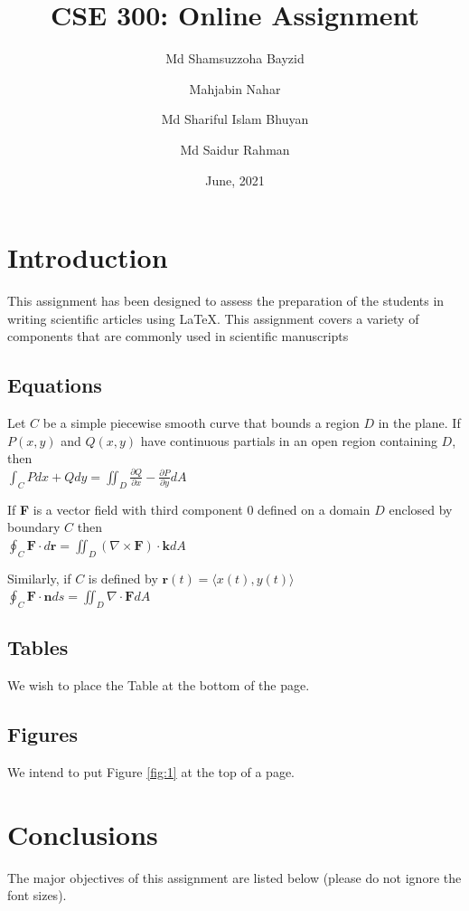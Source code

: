 \documentclass[12pt, a4paper]{article}
\title{CSE 300: Online Assignment}
\author{Md Shamsuzzoha Bayzid}
\author{Mahjabin Nahar}
\author{Md Shariful Islam Bhuyan}
\author{Md Saidur Rahman}
\affil[]{}
\date{June, 2021}
\begin{document}
	
\maketitle

\section{Introduction}
	This assignment has been designed to assess the preparation of the students
	in writing scientific articles using \LaTeX. This assignment covers a variety of
	components that are commonly used in scientific manuscripts
	
\subsection{Equations}
	Let $C$ be a simple piecewise smooth curve that bounds a region $D$ in the
	plane. If $P(x, y)$ and $Q(x, y)$ have continuous partials in an open region
	containing $D$, then \\
	$\int_C P dx + Q dy = \iint_D \frac{\partial Q}{\partial x} - \frac{\partial P}{\partial y} dA$
	
	If \textbf{F} is a vector field with third component 0 defined on a domain $D$
	enclosed by boundary $C$ then \\
	$\oint_C \textbf{F} \cdot d\textbf{r} = \iint_D(\nabla \times \textbf{F}) \cdot \textbf{k}dA$
	
	Similarly, if $C$ is defined by $\textbf{r}(t) = \langle x(t),y(t) \rangle$ \\
	$\oint_C \textbf{F} \cdot \textbf{n} ds = \iint_D \nabla \cdot \textbf{F}dA$
	
\subsection{Tables}
	We wish to place the Table at the bottom of the page.
	
\subsection{Figures}
	We intend to put Figure \ref{fig:1} at the top of a page.

\pagebreak
	
\section{Conclusions}
	The major objectives of this assignment are listed below (please do not ignore
the font sizes).
\end{document}
